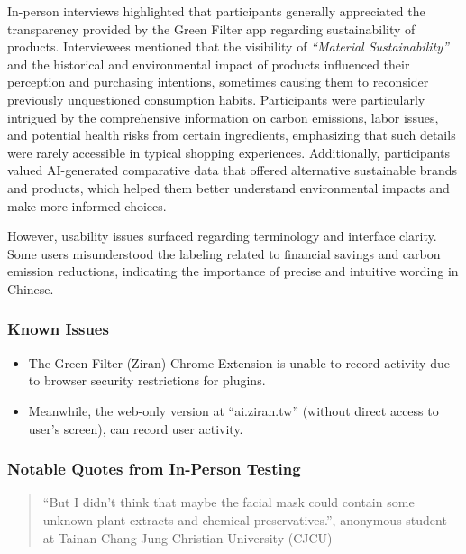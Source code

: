 \documentclass[
  12pt,
  letterpaper,
  DIV=11,
  numbers=noendperiod]{scrartcl}
\providecommand{\tightlist}{%
  \setlength{\itemsep}{0pt}\setlength{\parskip}{0pt}}
\begin{document}
In-person interviews highlighted that participants generally appreciated
the transparency provided by the Green Filter app regarding
sustainability of products. Interviewees mentioned that the visibility
of \emph{``Material Sustainability''} and the historical and
environmental impact of products influenced their perception and
purchasing intentions, sometimes causing them to reconsider previously
unquestioned consumption habits. Participants were particularly
intrigued by the comprehensive information on carbon emissions, labor
issues, and potential health risks from certain ingredients, emphasizing
that such details were rarely accessible in typical shopping
experiences. Additionally, participants valued AI-generated comparative
data that offered alternative sustainable brands and products, which
helped them better understand environmental impacts and make more
informed choices.

However, usability issues surfaced regarding terminology and interface
clarity. Some users misunderstood the labeling related to financial
savings and carbon emission reductions, indicating the importance of
precise and intuitive wording in Chinese.

\subsubsection{Known Issues}\label{known-issues}

\begin{itemize}
\tightlist
\item
  The Green Filter (Ziran) Chrome Extension is unable to record activity
  due to browser security restrictions for plugins.
\item
  Meanwhile, the web-only version at ``ai.ziran.tw'' (without direct
  access to user's screen), can record user activity.
\end{itemize}

\subsubsection{Notable Quotes from In-Person
Testing}\label{notable-quotes-from-in-person-testing}

\begin{quote}
``But I didn't think that maybe the facial mask could contain some
unknown plant extracts and chemical preservatives.'', anonymous student
at Tainan Chang Jung Christian University (CJCU)
\end{quote}
\end{document}
